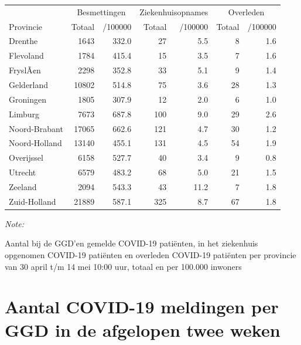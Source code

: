 \documentclass[
  english,
  man,floatsintext]{apa6}
\begin{document}
\begin{table}
\centering
\begin{threeparttable}
\begin{tabular}{lrrrrrr}
\toprule
\multicolumn{1}{c}{ } & \multicolumn{2}{c}{Besmettingen} & \multicolumn{2}{c}{Ziekenhuisopnames} & \multicolumn{2}{c}{Overleden} \\
\cmidrule(l{3pt}r{3pt}){2-3} \cmidrule(l{3pt}r{3pt}){4-5} \cmidrule(l{3pt}r{3pt}){6-7}
Provincie & Totaal & /100000 & Totaal & /100000 & Totaal & /100000\\
\midrule
Drenthe & 1643 & 332.0 & 27 & 5.5 & 8 & 1.6\\
Flevoland & 1784 & 415.4 & 15 & 3.5 & 7 & 1.6\\
FryslÃ¢n & 2298 & 352.8 & 33 & 5.1 & 9 & 1.4\\
Gelderland & 10802 & 514.8 & 75 & 3.6 & 28 & 1.3\\
Groningen & 1805 & 307.9 & 12 & 2.0 & 6 & 1.0\\
Limburg & 7673 & 687.8 & 100 & 9.0 & 29 & 2.6\\
Noord-Brabant & 17065 & 662.6 & 121 & 4.7 & 30 & 1.2\\
Noord-Holland & 13140 & 455.1 & 131 & 4.5 & 54 & 1.9\\
Overijssel & 6158 & 527.7 & 40 & 3.4 & 9 & 0.8\\
Utrecht & 6579 & 483.2 & 68 & 5.0 & 21 & 1.5\\
Zeeland & 2094 & 543.3 & 43 & 11.2 & 7 & 1.8\\
Zuid-Holland & 21889 & 587.1 & 325 & 8.7 & 67 & 1.8\\
\bottomrule
\end{tabular}
\begin{tablenotes}
\item \textit{Note: } 
\item Aantal bij de GGD’en gemelde COVID-19 patiënten, in het ziekenhuis opgenomen COVID-19 patiënten en overleden COVID-19 patiënten per provincie van 30 april t/m 14 mei 10:00 uur, totaal en per 100.000 inwoners
\end{tablenotes}
\end{threeparttable}
\end{table}

\newpage

\hypertarget{aantal-covid-19-meldingen-per-ggd-in-de-afgelopen-twee-weken}{%
\section{Aantal COVID-19 meldingen per GGD in de afgelopen twee weken}\label{aantal-covid-19-meldingen-per-ggd-in-de-afgelopen-twee-weken}}
\end{document}
